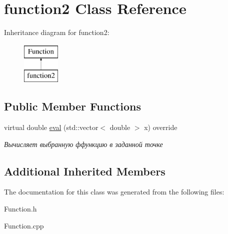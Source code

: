 \hypertarget{classfunction2}{}\section{function2 Class Reference}
\label{classfunction2}
Inheritance diagram for function2\+:\begin{figure}[H]
\begin{center}
\leavevmode
\includegraphics[height=2.000000cm]{classfunction2}
\end{center}
\end{figure}
\subsection*{Public Member Functions}
\begin{DoxyCompactItemize}
\item 
\mbox{\label{classfunction2_a025422903184307ecb17181cec02c79a}} 
virtual double \mbox{\hyperlink{classfunction2_a025422903184307ecb17181cec02c79a}{eval}} (std\+::vector$<$ double $>$ x) override
\begin{DoxyCompactList}\small\item\em Вычисляет выбранную ффункцию в заданной точке \end{DoxyCompactList}\end{DoxyCompactItemize}
\subsection*{Additional Inherited Members}


The documentation for this class was generated from the following files\+:\begin{DoxyCompactItemize}
\item 
Function.\+h\item 
Function.\+cpp\end{DoxyCompactItemize}
